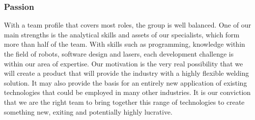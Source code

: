 \subsubsection{Passion}
With a team profile that covers most roles, the group is well balanced. One of our main strengths is the analytical skills and assets of our specialists, which form more than half of the team.  
With skills such as programming, knowledge within the field of robots, software design and lasers, each development challenge is within our area of expertise. 
Our motivation is the very real possibility that we will create a product that will provide the industry with a highly flexible welding solution. It may also provide the basis for an entirely new application of existing technologies that could be employed in many other industries.
It is our conviction that we are the right team to bring together this range of technologies to create something new, exiting and potentially highly lucrative.